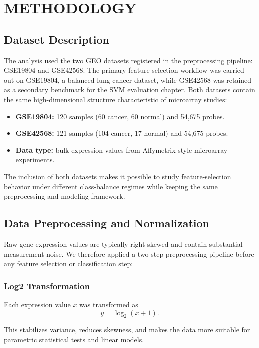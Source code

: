 \chapter{METHODOLOGY}

\section{Dataset Description}

The analysis used the two GEO datasets registered in the preprocessing pipeline: GSE19804 and GSE42568. The primary feature-selection workflow was carried out on GSE19804, a balanced lung-cancer dataset, while GSE42568 was retained as a secondary benchmark for the SVM evaluation chapter. Both datasets contain the same high-dimensional structure characteristic of microarray studies:

\begin{itemize}
    \item \textbf{GSE19804:} 120 samples (60 cancer, 60 normal) and 54,675 probes.
    \item \textbf{GSE42568:} 121 samples (104 cancer, 17 normal) and 54,675 probes.
    \item \textbf{Data type:} bulk expression values from Affymetrix-style microarray experiments.
\end{itemize}

The inclusion of both datasets makes it possible to study feature-selection behavior under different class-balance regimes while keeping the same preprocessing and modeling framework.

\section{Data Preprocessing and Normalization}

Raw gene-expression values are typically right-skewed and contain substantial measurement noise. We therefore applied a two-step preprocessing pipeline before any feature selection or classification step:

\subsection{Log2 Transformation}

Each expression value $x$ was transformed as
\begin{equation}
    y = \log_2(x + 1).
\end{equation}

This stabilizes variance, reduces skewness, and makes the data more suitable for parametric statistical tests and linear models.


